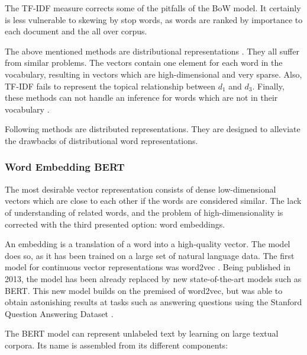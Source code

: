             The \ac{TF-IDF} measure corrects some of the pitfalls of the \ac{BoW} model. It certainly is less vulnerable to skewing by stop words,  as words are ranked by importance to each document and the all over corpus. 
            
            
            The above mentioned methods are distributional representations \cite{practicalNLP}. They all suffer from similar problems. The vectors contain one element for each word in the vocabulary, resulting in vectors which are high-dimensional and very sparse. Also, \ac{TF-IDF} fails to represent the topical relationship between $ d_{1} $ and $ d_{3}$. Finally, these methods can not handle an inference for words which are not in their vocabulary \cite{practicalNLP}.
            
            Following methods are distributed representations. They are designed to alleviate the drawbacks of distributional word representations.
            
            \subsubsection{Word Embedding BERT}
             The most desirable vector representation consists of dense low-dimensional vectors which are close to each other if the words are considered similar. The lack of understanding of related words, and the problem of high-dimensionality is corrected with the third presented option: word embeddings.
            
            An embedding is a translation of a word into a high-quality vector. The model does so, as it has been trained on a large set of natural language data. The first model for continuous vector representations was word2vec \cite{word2vec2013}. Being published in 2013, the model has been already replaced by new state-of-the-art models such as \acs{BERT}. This new model builds on the premised of word2vec, but was able to obtain astonishing results at tasks such as answering questions using the Stanford Question Answering Dataset \cite{BERT}. 
            
            The \ac{BERT} model can represent unlabeled text by learning on large textual corpora. Its name is assembled from its different components:
            
